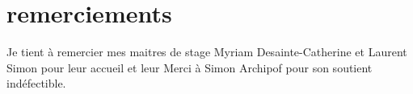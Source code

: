 \chapter*{remerciements}

Je tient à remercier mes maitres de stage Myriam Desainte-Catherine et Laurent Simon pour leur accueil et leur  
Merci à Simon Archipof pour son soutient indéfectible.
